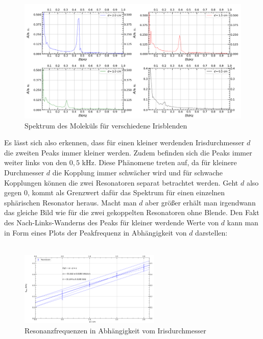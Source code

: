 \documentclass[german,  %
parskip=full,  %
]{scrartcl}
\begin{document}
\begin{figure}[h!]
\centering
\includegraphics[width=\textwidth]{451_Molekuel_fuer_verschiedene_Blenden.png}
\caption{Spektrum des Moleküls für verschiedene Irisblenden}
\end{figure}
\newpage
Es lässt sich also erkennen, dass für einen kleiner werdenden Irisdurchmesser $d$ die zweiten Peaks immer kleiner werden. Zudem befinden sich die Peaks immer weiter links von den $0,5$ kHz. Diese Phänomene treten auf, da für kleinere Durchmesser $d$ die Kopplung immer schwächer wird und für schwache Kopplungen können die zwei Resonatoren separat betrachtet werden. Geht $d$ also gegen $0$, kommt als Grenzwert dafür das Spektrum für einen einzelnen sphärischen Resonator heraus. Macht man $d$ aber größer erhält man irgendwann das gleiche Bild wie für die zwei gekoppelten Resonatoren ohne Blende.
\newline Den Fakt des Nach-Links-Wanderns des Peaks für kleiner werdende Werte von $d$ kann man in Form eines Plots der Peakfrequenz in Abhängigkeit von $d$ darstellen:
\\\\
\begin{figure}[h!]
\centering
\includegraphics[width=0.6\textwidth]{451_Resonanzen_ueber_Irisdurchmesser.png}
\caption{Resonanzfrequenzen in Abhängigkeit vom Irisdurchmesser}
\end{figure}
\\\\
\end{document}
